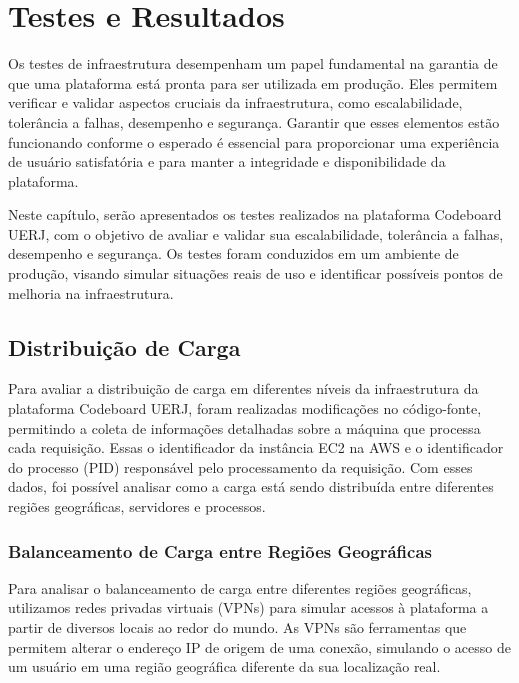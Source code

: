 \chapter{Testes e Resultados}

Os testes de infraestrutura desempenham um papel fundamental na garantia de que uma plataforma está pronta para ser utilizada em produção. Eles permitem verificar e validar aspectos cruciais da infraestrutura, como escalabilidade, tolerância a falhas, desempenho e segurança. Garantir que esses elementos estão funcionando conforme o esperado é essencial para proporcionar uma experiência de usuário satisfatória e para manter a integridade e disponibilidade da plataforma.

Neste capítulo, serão apresentados os testes realizados na plataforma Codeboard UERJ, com o objetivo de avaliar e validar sua escalabilidade, tolerância a falhas, desempenho e segurança. Os testes foram conduzidos em um ambiente de produção, visando simular situações reais de uso e identificar possíveis pontos de melhoria na infraestrutura.


\section{Distribuição de Carga}

Para avaliar a distribuição de carga em diferentes níveis da infraestrutura da plataforma Codeboard UERJ, foram realizadas modificações no código-fonte, permitindo a coleta de informações detalhadas sobre a máquina que processa cada requisição. Essas o identificador da instância EC2 na AWS e o identificador do processo (PID) responsável pelo processamento da requisição. Com esses dados, foi possível analisar como a carga está sendo distribuída entre diferentes regiões geográficas, servidores e processos.

\subsection{Balanceamento de Carga entre Regiões Geográficas} %

Para analisar o balanceamento de carga entre diferentes regiões geográficas, utilizamos redes privadas virtuais (VPNs) para simular acessos à plataforma a partir de diversos locais ao redor do mundo. As VPNs são ferramentas que permitem alterar o endereço IP de origem de uma conexão, simulando o acesso de um usuário em uma região geográfica diferente da sua localização real.

